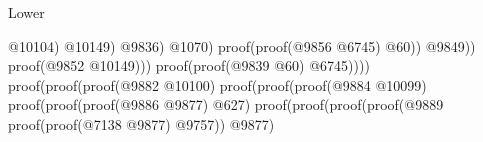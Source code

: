 \begin{lexlean}{Lower}
\begin{coremodule}
                                                                                                          @10104)
                                                                                                        @10149)
                                                                                                      @9836)
                                                                                                    @1070)
                                                                                                  proof(proof(@9856
                                                                                                        @6745)
                                                                                                      @60))
                                                                                                @9849))
                                                                                          proof(@9852
                                                                                              @10149)))
                                                                                    proof(proof(@9839
                                                                                          @60)
                                                                                        @6745))))
                                                                          proof(proof(proof(@9882
                                                                                  @10100)
                                                                                proof(proof(proof(@9884
                                                                                        @10099)
                                                                                      proof(proof(proof(@9886
                                                                                              @9877)
                                                                                            @627)
                                                                                          proof(proof(proof(proof(@9889
                                                                                                    proof(proof(@7138
                                                                                                          @9877)
                                                                                                        @9757))
                                                                                                  @9877)

\end{coremodule}
\end{lexlean}
